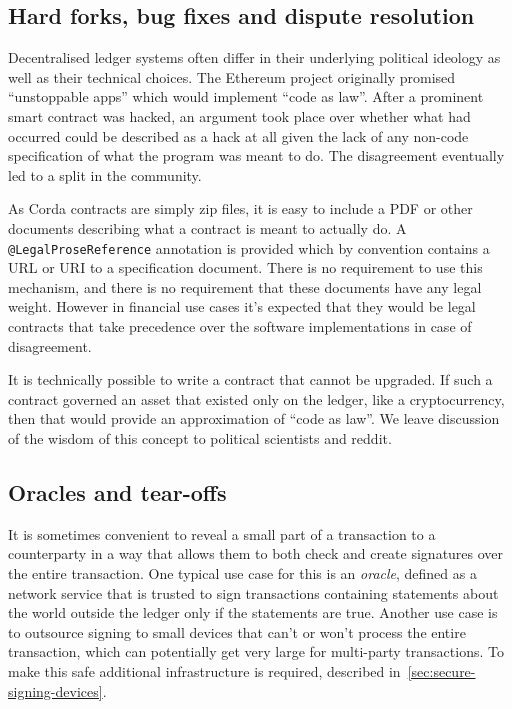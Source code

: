 \documentclass{article}
\begin{document}
\subsection{Hard forks, bug fixes and dispute resolution}\label{subsec:hard-forks,-bug-fixes-and-dispute-resolution}

Decentralised ledger systems often differ in their underlying political ideology as well as their technical
choices. The Ethereum project originally promised ``unstoppable apps'' which would implement ``code as law''. After
a prominent smart contract was hacked\cite{TheDAOHack}, an argument took place over whether what had occurred could
be described as a hack at all given the lack of any non-code specification of what the program was meant to do. The
disagreement eventually led to a split in the community.

As Corda contracts are simply zip files, it is easy to include a PDF or other documents describing what a contract
is meant to actually do. A \texttt{@LegalProseReference} annotation is provided which by convention contains a URL
or URI to a specification document. There is no requirement to use this mechanism, and there is no requirement that
these documents have any legal weight. However in financial use cases it's expected that they would be legal
contracts that take precedence over the software implementations in case of disagreement.

It is technically possible to write a contract that cannot be upgraded. If such a contract governed an asset that
existed only on the ledger, like a cryptocurrency, then that would provide an approximation of ``code as law''. We
leave discussion of the wisdom of this concept to political scientists and reddit.


\subsection{Oracles and tear-offs}\label{sec:tear-offs}

It is sometimes convenient to reveal a small part of a transaction to a counterparty in a way that allows them to
both check and create signatures over the entire transaction. One typical use case for this is an \emph{oracle},
defined as a network service that is trusted to sign transactions containing statements about the world outside the
ledger only if the statements are true. Another use case is to outsource signing to small devices that can't or
won't process the entire transaction, which can potentially get very large for multi-party transactions. To make
this safe additional infrastructure is required, described in~\cref{sec:secure-signing-devices}.
\end{document}
